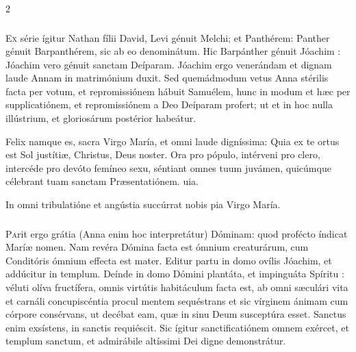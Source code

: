 \documentclass[9pt,twoside]{extarticle}
\begin{document}
\begin{multicols}{2}
\subsubsection*{\center{}}
\lettrine{E}x série ígitur Nathan fílii David, Levi génuit Melchi; et Panthérem: Panther génuit Barpanthérem, sic ab eo denominátum. Hic Barpánther génuit Jóachim : Jóachim vero génuit sanctam Deíparam. Jóachim ergo venerándam et dignam laude Annam in matrimónium duxit. Sed quemádmodum vetus Anna stérilis facta per votum, et repromissiónem hábuit Samuélem, hunc in modum et hæc per supplicatiónem, et repromissiónem a Deo Deíparam profert; ut et in hoc nulla illústrium, et gloriosárum postérior habeátur.

\begin{tightlist}{}
\item {} Felix namque es, sacra Virgo María, et omni laude digníssima: \textred{*} Quia ex te ortus est Sol justítiæ, Christus, Deus noster.  Ora pro pópulo, intérveni pro clero, intercéde pro devóto femíneo sexu, séntiant omnes tuum juvámen, quicúmque célebrant tuam sanctam Præsentatiónem. uia.
\item {\small {} In omni tribulatióne et angústia succúrrat nobis pia Virgo María.}
\end{tightlist}

\subsubsection*{\center{}}
\lettrine{P}arit ergo grátia (Anna enim hoc interpretátur) Dóminam: quod profécto índicat Maríæ nomen. Nam revéra Dómina facta est ómnium creaturárum, cum Conditóris ómnium effecta est mater. Editur partu in domo ovílis Jóachim, et addúcitur in templum. Deínde in domo Dómini plantáta, et impinguáta Spíritu : véluti olíva fructífera, omnis virtútis habitáculum facta est, ab omni sæculári vita et carnáli concupiscéntia procul mentem sequéstrans et sic vírginem ánimam cum córpore consérvans, ut decébat eam, quæ in sinu Deum susceptúra esset. Sanctus enim exsístens, in sanctis requiéscit. Sic ígitur sanctificatiónem omnem exércet, et templum sanctum, et admirábile altíssimi Dei digne demonstrátur.


\end{multicols}
\end{document}
